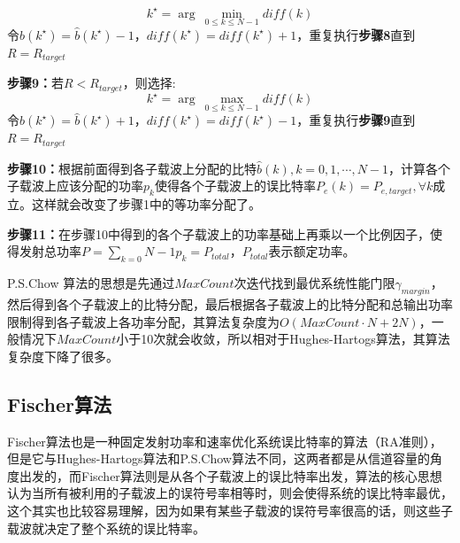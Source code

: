 \begin{description}
\begin{equation}
k^{\star} =\arg\ \underset{0\leq k\leq N-1}{\min}diff(k)
\end{equation}
令$\hat{b}(k^{\star})=\hat{b}(k^{\star})-1$，$diff(k^{\star})=diff(k^{\star})+1$，重复执行\textbf{步骤8}直到$R=R_{target}$
\item{\bf{步骤9：}}若$R<R_{target}$，则选择:
\begin{equation}
k^{\star} =\arg\ \underset{0\leq k\leq N-1}{\max}diff(k)
\end{equation}
令$\hat{b}(k^{\star})=\hat{b}(k^{\star})+1$，$diff(k^{\star})=diff(k^{\star})-1$，重复执行\textbf{步骤9}直到$R=R_{target}$
\item{\bf{步骤10：}}根据前面得到各子载波上分配的比特$\hat{b}(k), k=0,1,\cdots,N-1$，计算各个子载波上应该分配的功率$p_k$使得各个子载波上的误比特率$P_e(k)=P_{e,target}, \forall k$成立。这样就会改变了步骤1中的等功率分配了。
\item{\bf{步骤11：}}在步骤10中得到的各个子载波上的功率基础上再乘以一个比例因子，使得发射总功率$P=\sum_{k=0}{N-1}p_k=P_{total}$，$P_{total}$表示额定功率。
\end{description}

P.S.Chow 算法的思想是先通过$MaxCount$次迭代找到最优系统性能门限$\gamma_{margin}$，然后得到各个子载波上的比特分配，最后根据各子载波上的比特分配和总输出功率限制得到各子载波上各功率分配，其算法复杂度为$O(MaxCount\cdot N+2N)$，一般情况下$MaxCount$小于10次就会收敛，所以相对于Hughes-Hartogs算法，其算法复杂度下降了很多。
\subsection{Fischer算法}
Fischer算法\cite{fischer1996new}也是一种固定发射功率和速率优化系统误比特率的算法（RA准则），但是它与Hughes-Hartogs算法和P.S.Chow算法不同，这两者都是从信道容量的角度出发的，而Fischer算法则是从各个子载波上的误比特率出发，算法的核心思想认为当所有被利用的子载波上的误符号率相等时，则会使得系统的误比特率最优，这个其实也比较容易理解，因为如果有某些子载波的误符号率很高的话，则这些子载波就决定了整个系统的误比特率。

